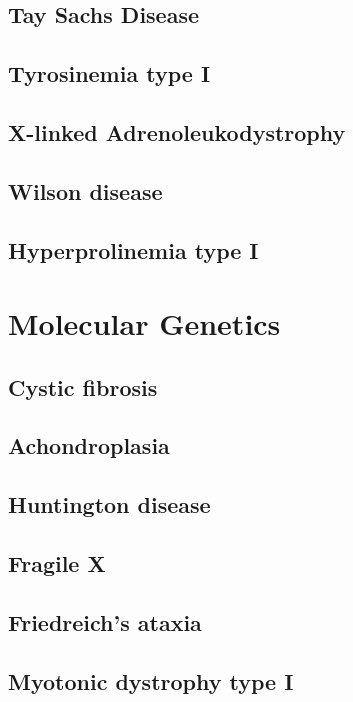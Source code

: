 \documentclass{scrartcl}
\begin{document}
\subsection{Tay Sachs Disease}
\label{sec:org935efff}
\subsection{Tyrosinemia type I}
\label{sec:orgbbedcda}
\subsection{X-linked Adrenoleukodystrophy}
\label{sec:orgba9472e}
\subsection{Wilson disease}
\label{sec:orgfa30e97}
\subsection{Hyperprolinemia type I}
\label{sec:orge0a5441}

\section{Molecular Genetics}
\label{sec:orgc3115a0}
\subsection{Cystic fibrosis}
\label{sec:org9d77574}
\subsection{Achondroplasia}
\label{sec:org3d6455d}
\subsection{Huntington disease}
\label{sec:orgb6b0ecb}
\subsection{Fragile X}
\label{sec:org8ccadd1}
\subsection{Friedreich's ataxia}
\label{sec:orgb908506}
\subsection{Myotonic dystrophy type I}
\label{sec:orgc839bef}
\end{document}
